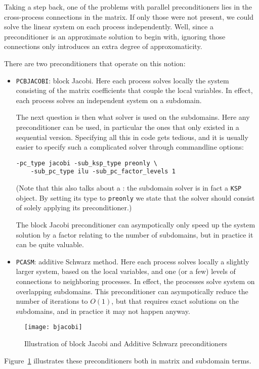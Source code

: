 Taking a step back, one of the problems with parallel preconditioners
lies in the cross-process connections in the matrix. If only those were not present,
we could solve the linear system on each process independently.
Well, since a preconditioner is an approximate solution to begin with,
ignoring those connections only introduces an extra degree of approxomaticity.

There are two preconditioners that operate on this notion:
\begin{itemize}
\item \lstinline{PCBJACOBI}: block Jacobi. Here each process solves locally the system
  consisting of the matrix coefficients that couple the local variables.
  In effect, each process solves an independent system on a subdomain.

  The next question is then what solver is used on the subdomains.
  Here any preconditioner can be used, in particular the ones that only
  existed in a sequential version. Specifying all this in code gets tedious,
  and it is usually easier to specify such a complicated solver through
  commandline options:
\begin{verbatim}
-pc_type jacobi -sub_ksp_type preonly \
    -sub_pc_type ilu -sub_pc_factor_levels 1 
\end{verbatim}
(Note that this also talks about a : the subdomain solver is in fact
a \lstinline{KSP} object. By setting its type to \lstinline{preonly} we state that the
solver should consist of solely applying its preconditioner.)

  The block Jacobi preconditioner can asympotically only speed up the
  system solution by a factor relating to the number of subdomains,
  but in practice it can be quite valuable.
\item \lstinline{PCASM}: additive Schwarz method. Here each process
  solves locally a slightly larger system, based on the local
  variables, and one (or a few) levels of connections to neighboring processes.
  In effect, the processes solve system on overlapping subdomains.
  This preconditioner can asympotically reduce the number of iterations to $O(1)$,
  but that requires exact solutions on the subdomains, and in practice it may
  not happen anyway.
\end{itemize}

\begin{figure}[ht]
  \texttt{[image: bjacobi]}
  \caption{Illustration of block Jacobi and Additive Schwarz preconditioners}
  \label{fig:bjacobi}
\end{figure}
Figure~\ref{fig:bjacobi} illustrates these preconditioners both in
matrix and subdomain terms.

